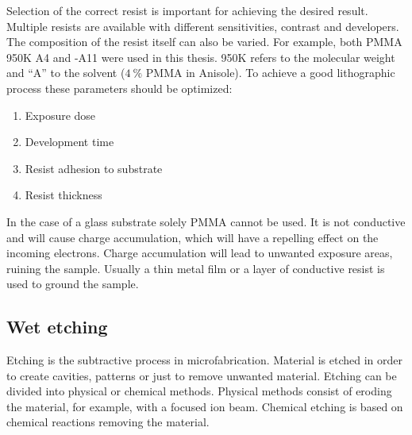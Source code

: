 \documentclass[final]{jyflluk}
\begin{document}
Selection of the correct resist is important for achieving the desired result. Multiple resists are available with different sensitivities, contrast and developers. The composition of the resist itself can also be varied. For example, both PMMA 950K A4 and -A11 were used in this thesis.  950K refers to the molecular weight and “A” to the solvent ($\SI{4}{\percent}$ PMMA in Anisole). To achieve a good lithographic process these parameters should be optimized:
\begin{enumerate}
    \renewcommand{\labelenumi}{\Roman{enumi}} 
    \setlength{\itemsep}{1pt}
    \setlength{\parskip}{1pt}
        \item Exposure dose
        \item Development time
        \item Resist adhesion to substrate
        \item Resist thickness
\end{enumerate}	
In the case of a glass substrate solely PMMA cannot be used. It is not conductive and  will cause charge accumulation, which will have a repelling effect on the incoming electrons. Charge accumulation will lead to unwanted exposure areas, ruining the sample. Usually a thin metal film or a layer of conductive resist is used to ground the sample.




\subsection{Wet etching}
\label{sec:xx4}

Etching is the subtractive process in microfabrication. Material is etched in order to create cavities, patterns or just to remove unwanted material. Etching can be divided into physical or chemical methods. Physical methods consist of eroding the material, for example, with a focused ion beam. Chemical etching is based on chemical reactions removing the material. 
\end{document}
